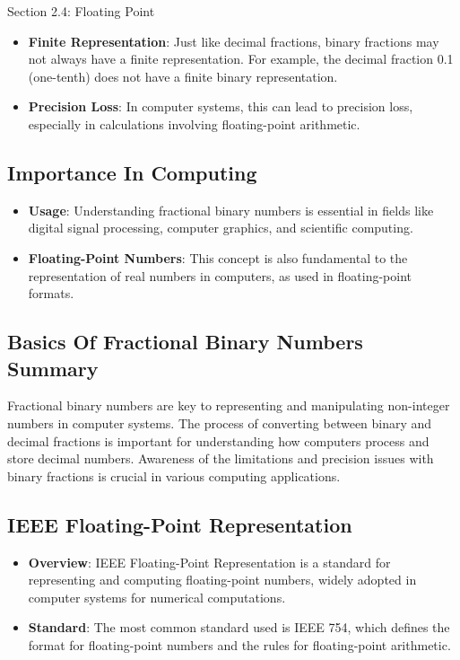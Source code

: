 \begin{notes}{Section 2.4: Floating Point}
    \begin{itemize}
        \item \textbf{Finite Representation}: Just like decimal fractions, binary fractions may not always have a finite representation. For example, the decimal fraction 0.1 (one-tenth) does not have 
        a finite binary representation.
        \item \textbf{Precision Loss}: In computer systems, this can lead to precision loss, especially in calculations involving floating-point arithmetic.
    \end{itemize}

    \subsection*{Importance In Computing}

    \begin{itemize}
        \item \textbf{Usage}: Understanding fractional binary numbers is essential in fields like digital signal processing, computer graphics, and scientific computing.
        \item \textbf{Floating-Point Numbers}: This concept is also fundamental to the representation of real numbers in computers, as used in floating-point formats.
    \end{itemize}

    \subsection*{Basics Of Fractional Binary Numbers Summary}

    Fractional binary numbers are key to representing and manipulating non-integer numbers in computer systems. The process of converting between binary and decimal fractions is important for understanding 
    how computers process and store decimal numbers. Awareness of the limitations and precision issues with binary fractions is crucial in various computing applications. \vspace*{1em}

    \subsection*{IEEE Floating-Point Representation}

    \begin{itemize}
        \item \textbf{Overview}: IEEE Floating-Point Representation is a standard for representing and computing floating-point numbers, widely adopted in computer systems for numerical computations.
        \item \textbf{Standard}: The most common standard used is IEEE 754, which defines the format for floating-point numbers and the rules for floating-point arithmetic.
    \end{itemize}
    

\end{notes}
